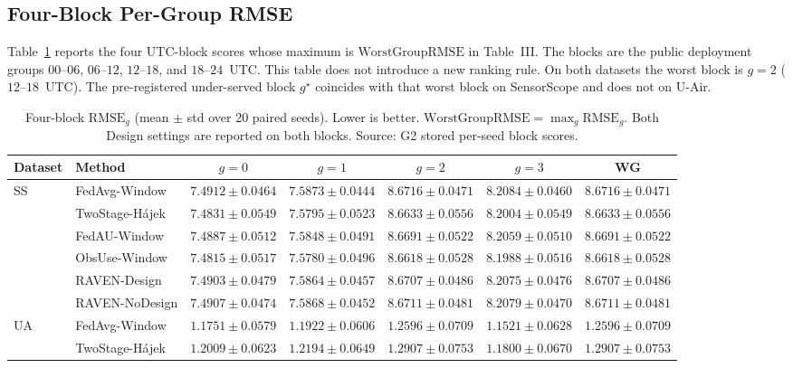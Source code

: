 \subsection{Four-Block Per-Group RMSE}
\label{app:block_rmse}

Table~\ref{tab:app_block_rmse} reports the four UTC-block scores whose
maximum is $\mathrm{WorstGroupRMSE}$ in
Table~III.  The blocks are the public
deployment groups $00$--$06$, $06$--$12$, $12$--$18$, and $18$--$24$~UTC.
This table does not introduce a new ranking rule.  On both datasets the
worst block is $g=2$ ($12$--$18$~UTC).  The pre-registered under-served
block $g^{\star}$ coincides with that worst block on SensorScope and
does not on U-Air.

\begin{table}[t]
\centering
\caption{Four-block $\mathrm{RMSE}_g$ (mean $\pm$ std over 20 paired
seeds).  Lower is better.  $\mathrm{WorstGroupRMSE}=\max_g\mathrm{RMSE}_g$.
Both Design settings are reported on both blocks.
Source: G2 stored per-seed block scores.}
\label{tab:app_block_rmse}
\footnotesize
\setlength{\tabcolsep}{4pt}
\begin{tabular*}{\textwidth}{@{\extracolsep{\fill}}llccccc}
\toprule
Dataset & Method & $g{=}0$ & $g{=}1$ & $g{=}2$ & $g{=}3$ & WG\\
\midrule
\multirow{6}{*}{SS}
& FedAvg-Window & $7.4912{\pm}0.0464$ & $7.5873{\pm}0.0444$ & $8.6716{\pm}0.0471$ & $8.2084{\pm}0.0460$ & $8.6716{\pm}0.0471$\\
& TwoStage-H\'ajek & $7.4831{\pm}0.0549$ & $7.5795{\pm}0.0523$ & $8.6633{\pm}0.0556$ & $8.2004{\pm}0.0549$ & $8.6633{\pm}0.0556$\\
& FedAU-Window & $7.4887{\pm}0.0512$ & $7.5848{\pm}0.0491$ & $8.6691{\pm}0.0522$ & $8.2059{\pm}0.0510$ & $8.6691{\pm}0.0522$\\
& ObsUse-Window & $7.4815{\pm}0.0517$ & $7.5780{\pm}0.0496$ & $8.6618{\pm}0.0528$ & $8.1988{\pm}0.0516$ & $8.6618{\pm}0.0528$\\
& RAVEN-Design & $7.4903{\pm}0.0479$ & $7.5864{\pm}0.0457$ & $8.6707{\pm}0.0486$ & $8.2075{\pm}0.0476$ & $8.6707{\pm}0.0486$\\
& RAVEN-NoDesign & $7.4907{\pm}0.0474$ & $7.5868{\pm}0.0452$ & $8.6711{\pm}0.0481$ & $8.2079{\pm}0.0470$ & $8.6711{\pm}0.0481$\\
\midrule
\multirow{6}{*}{UA}
& FedAvg-Window & $1.1751{\pm}0.0579$ & $1.1922{\pm}0.0606$ & $1.2596{\pm}0.0709$ & $1.1521{\pm}0.0628$ & $1.2596{\pm}0.0709$\\
& TwoStage-H\'ajek & $1.2009{\pm}0.0623$ & $1.2194{\pm}0.0649$ & $1.2907{\pm}0.0753$ & $1.1800{\pm}0.0670$ & $1.2907{\pm}0.0753$\\

\end{tabular*}
\end{table}
